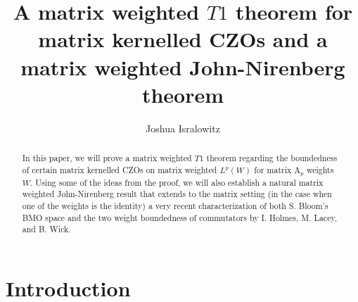 \documentclass[12pt,reqno ]{amsart}
\numberwithin{equation}{section}
\theoremstyle{definition}
\begin{document}
\title[A Matrix weighted $T1$ and John-Nirenberg theorem]{A matrix weighted $T1$ theorem for matrix kernelled CZOs and a matrix weighted John-Nirenberg theorem}


\author[Joshua Isralowitz]{Joshua Isralowitz}
\address[Joshua Isralowitz]{Department of Mathematics and Statistics \\
SUNY Albany \\
1400 Washington Ave. \\
 Albany, NY  \\
12222}




\begin{abstract}
In this paper, we will prove a matrix weighted $T1$ theorem regarding the boundedness of certain matrix kernelled CZOs on matrix weighted $L^p(W)$ for matrix A${}_p$ weights $W$.  Using some of the ideas from the proof, we will also establish a natural matrix weighted John-Nirenberg result that extends to the matrix setting (in the case when one of the weights is the identity) a very recent characterization of both S. Bloom's BMO space and the two weight boundedness of commutators by I. Holmes, M. Lacey, and B. Wick.
\end{abstract}


\maketitle








\section{Introduction}
\end{document}
